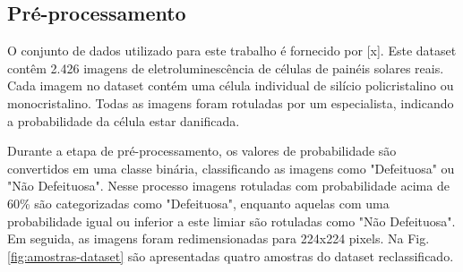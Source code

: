 \documentclass[conference]{IEEEtran}
\begin{document}
\subsection{Pré-processamento}\label{AA}

O conjunto de dados utilizado para este trabalho é fornecido por [x]. Este
dataset contêm 2.426 imagens de eletroluminescência de células de painéis
solares reais. Cada imagem no dataset contém uma célula individual de silício
policristalino ou monocristalino. Todas as imagens foram rotuladas por um
especialista,
indicando a probabilidade da célula estar danificada.

Durante a etapa de pré-processamento, os valores de
probabilidade são convertidos em uma classe binária, classificando as imagens
como "Defeituosa" ou "Não Defeituosa". Nesse processo imagens rotuladas com
probabilidade acima de 60\% são categorizadas como "Defeituosa", enquanto
aquelas com uma probabilidade igual ou inferior a este limiar são rotuladas
como "Não Defeituosa". Em seguida, as imagens foram redimensionadas para
224x224 pixels. Na Fig.\ref{fig:amostras-dataset} são apresentadas quatro
amostras do
dataset reclassificado.
\end{document}
